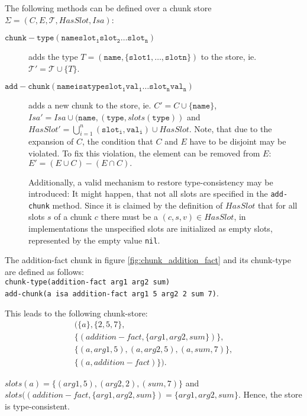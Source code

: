 \begin{definition}
\label{def:abstract_methods_chunk_store}
The following methods can be defined over a chunk store $\Sigma = (C, E, \mathcal{T}, HasSlot, Isa)$:

\begin{description}
 \item[$\mathtt{chunk-type(name slot_1 slot_2 \dots slot_n)}$] adds the type $T = (\mathtt{name},\{\mathtt{slot1}, \dots, \mathtt{slotn}\})$ to the store, ie. $\mathcal{T'} = \mathcal{T} \cup \{T\}$. 
 \item[$\mathtt{add-chunk(name isa type slot_1 val_1 \dots slot_n val_n)}$] adds a new chunk to the store, ie. $C' = C \cup \{ \mathtt{name} \}$, $Isa' = Isa \cup (\mathtt{name}, (\mathtt{type}, slots(\mathtt{type}))$ and $HasSlot' = \bigcup_{i = 1}^n{\mathtt{(slot_i,val_i)}} \cup HasSlot.$ Note, that due to the expansion of $C$, the condition that $C$ and $E$ have to be disjoint may be violated. To fix this violation, the element can be removed from $E$: $E' = (E \cup C) - (E \cap C).$ 
 
 Additionally, a valid mechanism to restore type-consistency may be introduced: It might happen, that not all slots are specified in the \verb|add-chunk| method. Since it is claimed by the definition of $HasSlot$ that for all slots $s$ of a chunk $c$ there must be a $(c,s,v) \in HasSlot$, in implementations the unspecified slots are initialized as empty slots, represented by the empty value \verb|nil|.
\end{description} 
\end{definition}


\begin{example}
 The addition-fact chunk in figure \ref{fig:chunk_addition_fact} and its chunk-type are defined as follows:\\
 \verb|chunk-type(addition-fact arg1 arg2 sum)|\\
 \verb|add-chunk(a isa addition-fact arg1 5 arg2 2 sum 7)|.
 
 This leads to the following chunk-store: 
 \begin{align*}
 (\{a\}, \{2,5,7\},\\ 
 \{(addition-fact, \{arg1, arg2, sum\})\},\\
 \{(a,arg1,5), (a,arg2,5), (a,sum,7)\},\\
 \{(a, addition-fact)\}).
 \end{align*}
 
 $slots(a) = \{(arg1,5), (arg2,2), (sum,7)\}$ and $slots((addition-fact,\{arg1, arg2, sum\}) = \{arg1, arg2, sum\}$. Hence, the store is type-consistent.
\end{example}

